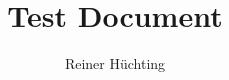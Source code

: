 \documentclass{scrartcl}
\title{Test Document}
\author{Reiner Hüchting}
\begin{document}
    \hello
\end{document}
